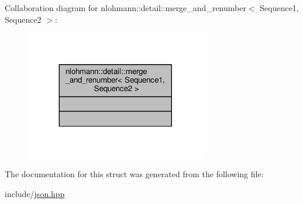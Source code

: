 Collaboration diagram for nlohmann\+:\+:detail\+:\+:merge\+\_\+and\+\_\+renumber$<$ Sequence1, Sequence2 $>$\+:
\nopagebreak
\begin{figure}[H]
\begin{center}
\leavevmode
\includegraphics[width=224pt]{structnlohmann_1_1detail_1_1merge__and__renumber__coll__graph}
\end{center}
\end{figure}


The documentation for this struct was generated from the following file\+:\begin{DoxyCompactItemize}
\item 
include/\hyperlink{json_8hpp}{json.\+hpp}\end{DoxyCompactItemize}
